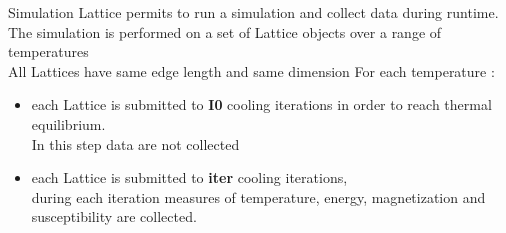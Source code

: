 Simulation Lattice permits to run a simulation and collect data during runtime.
The simulation is performed on a set of Lattice objects over a range of temperatures \\
All Lattices have same edge length and same dimension
For each temperature :  
\begin{itemize}
	\item[] each Lattice is submitted to \textbf{I0} cooling iterations in order to reach thermal equilibrium. \\ In this step data are not collected
	\item[] each Lattice is submitted to \textbf{iter} cooling iterations,   \\
	 		during each iteration measures of temperature, energy, magnetization and susceptibility are 				collected. 
\end{itemize} 
 
